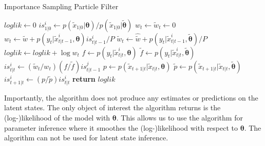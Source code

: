\documentclass[11pt, oneside]{scrreprt}   	%
\begin{document}
\begin{algorithm}[h!]
\caption{Importance Sampling Particle Filter}
\label{alg:is}
\begin{algorithmic}[1]
      	\smallskip
	\State $loglik \gets 0$
		\State $is_{1 | 0 }^i \gets p(\tilde{x}_{1 | 0 } | \boldsymbol{\theta}) / p(\tilde{x}_{1 | 0 } | \boldsymbol{\tilde{\theta}})$ 
	\EndFor
      	\smallskip
		\State $w_t \gets \tilde{w}_t \gets 0$
      		 
      			\State $w_t \gets \tilde{w} + p(y_t | \tilde{x}_{t | t-1}^i, \boldsymbol{\theta})is_{t | t-1 }^i / P$ 
      			\State $\tilde{w}_t \gets \widehat{\tilde{w}} + p(y_t | \tilde{x}_{t | t-1}^i, \boldsymbol{\tilde{\theta}}) / P$ 
		\EndFor	
		\State $loglik \gets loglik + \log w_t$
		\smallskip
		 
			\State $f \gets p(y_t | \tilde{x}_{t | t}^i, \boldsymbol{\theta})$ 
			\State $\tilde{f} \gets p(y_t | \tilde{x}_{t | t}^i, \boldsymbol{\tilde{\theta}})$ 
			\smallskip
			\State $is_{t | t }^i \gets (\tilde{w}_t / w_t) (f / \tilde{f}) is_{t | t-1 }^j$ 
		\EndFor	
		\smallskip
			 
				\State $p \gets p(\tilde{x}_{t+1 | t } | \tilde{x}_{t | t }, \boldsymbol{\theta})$ 
				\State $\tilde{p} \gets p(\tilde{x}_{t+1 | t } | \tilde{x}_{t | t }, \boldsymbol{\tilde{\theta}}) $ 
				\smallskip
				\State $is_{t+1 | t }^i \gets (p / \tilde{p}) is_{t | t }^i$ 
			\EndFor
		\EndIf
      \EndFor
      \smallskip
      \State \textbf{return} $loglik$
    \EndProcedure
  \end{algorithmic}
\end{algorithm}
Importantly, the algorithm does not produce any estimates or predictions on the latent states. The only object of interest the algorithm returns is the (log-)likelihood of the model with $\boldsymbol{\theta}$. This allows us to use the algorithm for parameter inference where it smoothes the (log-)likelihood with respect to $\boldsymbol{\theta}$. The algorithm can not be used for latent state inference.

\end{document}
